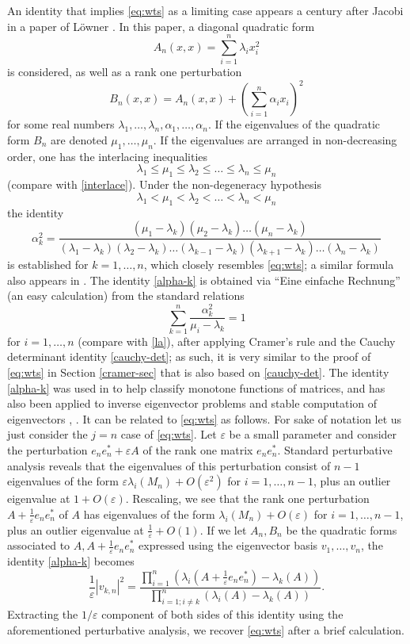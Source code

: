 \documentclass[12pt]{amsart}
\newcommand\eps{\varepsilon}
\begin{document}
An identity that implies \eqref{eq:wts} as a limiting case appears a century after Jacobi in a paper of L\"owner \cite[(7)]{Lowner}.  In this paper, a diagonal quadratic form
$$ A_n(x,x) = \sum_{i=1}^n \lambda_i x_i^2$$
is considered, as well as a rank one perturbation
$$ B_n(x,x) = A_n(x,x) + \left( \sum_{i=1}^n \alpha_i x_i \right)^2$$
for some real numbers $\lambda_1,\dots,\lambda_n,\alpha_1,\dots,\alpha_n$.  If the eigenvalues of the quadratic form $B_n$ are denoted $\mu_1,\dots,\mu_n$. If the eigenvalues are arranged in non-decreasing order, one has the interlacing inequalities
$$\lambda_1 \leq \mu_1 \leq \lambda_2 \leq \dots \leq \lambda_n \leq \mu_n$$
(compare with \eqref{interlace}).  Under the non-degeneracy hypothesis
$$\lambda_1 < \mu_1 < \lambda_2 < \dots < \lambda_n < \mu_n$$
the identity
\begin{equation}\label{alpha-k}
 \alpha_k^2 = \frac{(\mu_1-\lambda_k) (\mu_2 - \lambda_k) \dots (\mu_n - \lambda_k)}{(\lambda_1-\lambda_k) (\lambda_2 - \lambda_k) \dots (\lambda_{k-1} - \lambda_k) (\lambda_{k+1} - \lambda_k) \dots (\lambda_n - \lambda_k)}
\end{equation}
is established for $k=1,\dots,n$, which closely resembles \eqref{eq:wts}; a similar formula also appears in \cite[\S 12]{jacobi}.  The identity \eqref{alpha-k} is obtained via ``Eine einfache Rechnung'' (an easy calculation) from the standard relations
$$ \sum_{k=1}^n \frac{\alpha_k^2}{\mu_i - \lambda_k} = 1$$
for $i=1,\dots,n$ (compare with \eqref{la}), after applying Cramer's rule and the Cauchy determinant identity \eqref{cauchy-det}; as such, it is very similar to the proof of \eqref{eq:wts} in Section \ref{cramer-sec} that is also based on \eqref{cauchy-det}.   The identity \eqref{alpha-k} was used in \cite{Lowner} to help classify monotone functions of matrices, and has also been applied to inverse eigenvector problems and stable computation of eigenvectors \cite{GE}, \cite[p. 224-226]{demmel}.  It can be related to \eqref{eq:wts} as follows.  For sake of notation let us just consider the $j=n$ case of \eqref{eq:wts}.  Let $\eps$ be a small parameter and consider the perturbation $e_n e_n^* + \eps A$ of the rank one matrix $e_n e_n^*$.  Standard perturbative analysis reveals that the eigenvalues of this perturbation consist of $n-1$ eigenvalues of the form $\eps \lambda_i(M_n) + O(\eps^2)$ for $i=1,\dots,n-1$, plus an outlier eigenvalue at $1+O(\eps)$.  Rescaling, we see that the rank one perturbation $A + \frac{1}{\eps} e_n e_n^*$ of $A$ has eigenvalues of the form $\lambda_i(M_n) + O(\eps)$ for $i=1,\dots,n-1$, plus an outlier eigenvalue at $\frac{1}{\eps}+O(1)$.  If we let $A_n, B_n$ be the quadratic forms associated to $A, A + \frac{1}{\eps} e_n e_n^*$ expressed using the eigenvector basis $v_1,\dots,v_n$, the identity \eqref{alpha-k} becomes
$$ \frac{1}{\eps} |v_{k,n}|^2 = \frac{\prod_{i=1}^n (\lambda_i( A + \frac{1}{\eps} e_n e_n^* ) - \lambda_k(A))}{\prod_{i=1; i \neq k}^n (\lambda_i(A) - \lambda_k(A))}.$$
Extracting the $1/\eps$ component of both sides of this identity using the aforementioned perturbative analysis, we recover \eqref{eq:wts} after a brief calculation.
\end{document}
